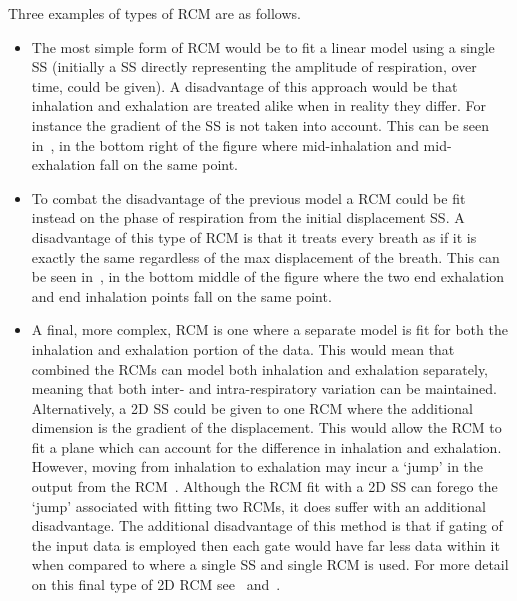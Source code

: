                 Three examples of types of \gls{RCM} are as follows.

                \begin{itemize}
                    \item The most simple form of \gls{RCM} would be to fit a linear model using a single \gls{SS} (initially a \gls{SS} directly representing the amplitude of respiration, over time, could be given). A disadvantage of this approach would be that inhalation and exhalation are treated alike when in reality they differ. For instance the gradient of the \gls{SS} is not taken into account. This can be seen in~, in the bottom right of the figure where mid-inhalation and mid-exhalation fall on the same point.

                    \item To combat the disadvantage of the previous model a \gls{RCM} could be fit instead on the phase of respiration from the initial displacement \gls{SS}. A disadvantage of this type of \gls{RCM} is that it treats every breath as if it is exactly the same regardless of the max displacement of the breath. This can be seen in~, in the bottom middle of the figure where the two end exhalation and end inhalation points fall on the same point.

                    \item A final, more complex, \gls{RCM} is one where a separate model is fit for both the inhalation and exhalation portion of the data. This would mean that combined the \glspl{RCM} can model both inhalation and exhalation separately, meaning that both inter- and intra-respiratory variation can be maintained. Alternatively, a \gls{2D} \gls{SS} could be given to one \gls{RCM} where the additional dimension is the gradient of the displacement. This would allow the \gls{RCM} to fit a plane which can account for the difference in inhalation and exhalation. However, moving from inhalation to exhalation may incur a `jump' in the output from the \gls{RCM}~\parencite{McClelland2013}. Although the \gls{RCM} fit with a \gls{2D} \gls{SS} can forego the `jump' associated with fitting two \glspl{RCM}, it does suffer with an additional disadvantage. The additional disadvantage of this method is that if gating of the input data is employed then each gate would have far less data within it when compared to where a single \gls{SS} and single \gls{RCM} is used. For more detail on this final type of \gls{2D} \gls{RCM} see~ and~.
                \end{itemize}

